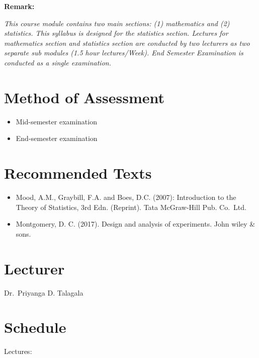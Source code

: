\documentclass[]{book}
\providecommand{\tightlist}{%
  \setlength{\itemsep}{0pt}\setlength{\parskip}{0pt}}
\begin{document}
\textbf{Remark:}

\emph{This course module contains two main sections: (1) mathematics and (2) statistics. This syllabus is designed for the statistics section. Lectures for mathematics section and statistics section are conducted by two lecturers as two separate sub modules (1.5 hour lectures/Week). End Semester Examination is conducted as a single examination.}

\hypertarget{method-of-assessment}{%
\section*{Method of Assessment}\label{method-of-assessment}}

\begin{itemize}
\tightlist
\item
  Mid-semester examination
\item
  End-semester examination
\end{itemize}

\hypertarget{recommended-texts}{%
\section{Recommended Texts}\label{recommended-texts}}

\begin{itemize}
\tightlist
\item
  Mood, A.M., Graybill, F.A. and Boes, D.C. (2007): Introduction to the Theory of Statistics, 3rd Edn.
  (Reprint). Tata McGraw-Hill Pub. Co.~Ltd.~
\item
  Montgomery, D. C. (2017). Design and analysis of experiments. John wiley \& sons.
\end{itemize}

\hypertarget{lecturer}{%
\section*{Lecturer}\label{lecturer}}

Dr.~Priyanga D. Talagala

\hypertarget{schedule}{%
\section*{Schedule}\label{schedule}}

Lectures:
\end{document}

